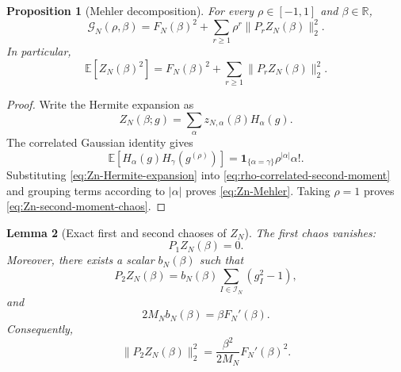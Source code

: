 \documentclass[11pt]{article}
\newtheorem{proposition}{Proposition}
\newtheorem{lemma}[proposition]{Lemma}
\newcommand{\E}{\mathbb{E}}
\newcommand{\calI}{\mathcal{I}}
\newcommand{\ind}{\mathbf{1}}
\newcommand{\norm}[1]{\lVert #1\rVert}
\newcommand{\R}{\mathbb{R}}
\begin{document}
\begin{proposition}[Mehler decomposition]\label{prop:Zn-Mehler}
  For every $\rho\in[-1,1]$ and $\beta\in\R$,
  \begin{equation}\label{eq:Zn-Mehler}
    \mathcal G_N(\rho,\beta)
    =
    F_N(\beta)^2
    +
    \sum_{r\geq1}\rho^r\norm{P_rZ_N(\beta)}_2^2.
  \end{equation}
  In particular,
  \begin{equation}\label{eq:Zn-second-moment-chaos}
    \E[Z_N(\beta)^2]
    =
    F_N(\beta)^2
    +
    \sum_{r\geq1}\norm{P_rZ_N(\beta)}_2^2.
  \end{equation}
\end{proposition}

\begin{proof}
  Write the Hermite expansion as
  \begin{equation}\label{eq:Zn-Hermite-expansion}
    Z_N(\beta;g)
    =
    \sum_{\alpha}z_{N,\alpha}(\beta)H_\alpha(g).
  \end{equation}
  The correlated Gaussian identity gives
  \begin{equation}\label{eq:correlated-Hermite-identity}
    \E\left[
      H_\alpha(g)H_\gamma(g^{(\rho)})
    \right]
    =
    \ind_{\{\alpha=\gamma\}}\rho^{|\alpha|}\alpha!.
  \end{equation}
  Substituting \eqref{eq:Zn-Hermite-expansion} into
  \eqref{eq:rho-correlated-second-moment} and grouping terms according to
  $|\alpha|$ proves \eqref{eq:Zn-Mehler}.  Taking $\rho=1$ proves
  \eqref{eq:Zn-second-moment-chaos}.
\end{proof}

\begin{lemma}[Exact first and second chaoses of $Z_N$]
  \label{lem:Zn-first-second-chaos}
  The first chaos vanishes:
  \begin{equation}\label{eq:Zn-first-chaos-zero}
    P_1Z_N(\beta)=0.
  \end{equation}
  Moreover, there exists a scalar $b_N(\beta)$ such that
  \begin{equation}\label{eq:Zn-second-chaos}
    P_2Z_N(\beta)
    =
    b_N(\beta)
    \sum_{I\in\calI_N}(g_I^2-1),
  \end{equation}
  and
  \begin{equation}\label{eq:bn-exact}
    2M_Nb_N(\beta)
    =
    \beta F_N'(\beta).
  \end{equation}
  Consequently,
  \begin{equation}\label{eq:Zn-second-chaos-norm}
    \norm{P_2Z_N(\beta)}_2^2
    =
    \frac{\beta^2}{2M_N}F_N'(\beta)^2.
  \end{equation}
\end{lemma}
\end{document}
